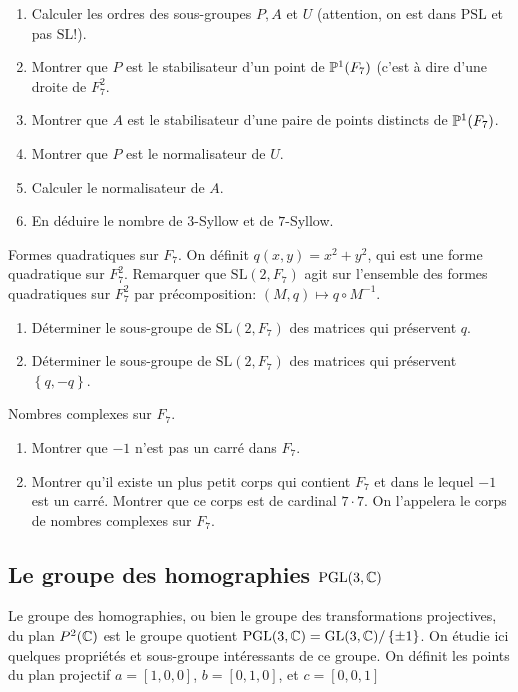 \begin{enumerate}
	\item Calculer les ordres des sous-groupes
		$P, A $ et $ U $ (attention, on est dans
		$ \mathrm{PSL} $ et pas $ \mathrm{SL} $!).
	\item Montrer que $ P $ est le stabilisateur
		d'un point de
		$ \mathbb{P}^{1}(F_{7}) $
		(c'est à dire d'une droite de $ F_{7}^{2} $.
	\item Montrer que $ A $ est le stabilisateur
		d'une paire de points distincts de
		$ \mathbb{P}^{1}(F_{7}) $.
	\item Montrer que $ P $ est le normalisateur
		de $ U $.
	\item Calculer le normalisateur de $ A $.
	\item En déduire le nombre de $ 3 $-Syllow et de $ 7 $-Syllow.
\end{enumerate}

Formes quadratiques sur $ F_{7} $.
On définit $ q(x,y) = x^2+y^2 $,
qui est une forme quadratique
sur $ F_{7}^2 $.
Remarquer que
$ \mathrm{SL}(2, F_{7}) $
agit sur l'ensemble des formes quadratiques
sur $ F_{7}^2 $
par précomposition:
$ (M, q) \mapsto q \circ M^{-1} $.
\begin{enumerate}
	\item Déterminer le sous-groupe
		de $ \mathrm{SL}(2, F_{7}) $
		des matrices
		qui préservent $ q $.
	\item Déterminer le sous-groupe
		de $ \mathrm{SL}(2, F_{7}) $
		des matrices
		qui préservent
		$ \left\{ q, -q \right\} $.
\end{enumerate}

Nombres complexes sur
$ F_{7} $.

\begin{enumerate}
	\item Montrer que $ -1 $ n'est pas un carré
		dans $ F_{7} $.
	\item Montrer qu'il existe un plus petit corps
		qui contient $ F_{7} $ et dans le lequel
		$ -1 $ est un carré. Montrer que ce corps
		est de cardinal $ 7 \cdot 7 $.
		On l'appelera le corps de nombres complexes
		sur $ F_{7} $.
\end{enumerate}

\subsection{Le groupe des homographies $\mathrm{PGL}(3, \mathbb{C})$}
\label{sub:homographies}

Le groupe des homographies, ou bien le groupe des transformations projectives,
du plan $ P^{2} (\mathbb{C}) $
est le groupe
quotient
$ \mathrm{PGL}(3, \mathbb{C})
=
\mathrm{GL}(3, \mathbb{C})
/
\left\{ \pm 1 \right\}
$.
On étudie ici quelques propriétés et sous-groupe intéressants de ce groupe.
On définit les points du plan projectif
$ a = [1, 0, 0] $,
$ b = [0, 1, 0] $,
et
$ c = [0, 0, 1] $

